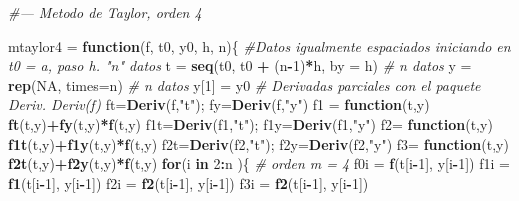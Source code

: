 \documentclass[]{article}
\newenvironment{Shaded}{\begin{snugshade}}{\end{snugshade}}
\newcommand{\KeywordTok}[1]{\textcolor[rgb]{0.13,0.29,0.53}{\textbf{#1}}}
\newcommand{\DataTypeTok}[1]{\textcolor[rgb]{0.13,0.29,0.53}{#1}}
\newcommand{\DecValTok}[1]{\textcolor[rgb]{0.00,0.00,0.81}{#1}}
\newcommand{\StringTok}[1]{\textcolor[rgb]{0.31,0.60,0.02}{#1}}
\newcommand{\CommentTok}[1]{\textcolor[rgb]{0.56,0.35,0.01}{\textit{#1}}}
\newcommand{\OtherTok}[1]{\textcolor[rgb]{0.56,0.35,0.01}{#1}}
\newcommand{\ControlFlowTok}[1]{\textcolor[rgb]{0.13,0.29,0.53}{\textbf{#1}}}
\newcommand{\OperatorTok}[1]{\textcolor[rgb]{0.81,0.36,0.00}{\textbf{#1}}}
\newcommand{\NormalTok}[1]{#1}
\begin{document}
\begin{Shaded}
\begin{Highlighting}[]
\CommentTok{#--- Metodo de Taylor, orden 4}

\NormalTok{mtaylor4 =}\StringTok{ }\ControlFlowTok{function}\NormalTok{(f, t0, y0, h, n)\{}
\CommentTok{#Datos igualmente espaciados iniciando en t0 = a, paso h. "n" datos }
\NormalTok{t =}\StringTok{ }\KeywordTok{seq}\NormalTok{(t0, t0 }\OperatorTok{+}\StringTok{ }\NormalTok{(n}\OperatorTok{-}\DecValTok{1}\NormalTok{)}\OperatorTok{*}\NormalTok{h, }\DataTypeTok{by =}\NormalTok{ h) }\CommentTok{# n datos}
\NormalTok{y =}\StringTok{ }\KeywordTok{rep}\NormalTok{(}\OtherTok{NA}\NormalTok{, }\DataTypeTok{times=}\NormalTok{n) }\CommentTok{# n datos}
\NormalTok{y[}\DecValTok{1}\NormalTok{] =}\StringTok{ }\NormalTok{y0}
  \CommentTok{# Derivadas parciales con el paquete Deriv. Deriv(f)}
\NormalTok{ft=}\KeywordTok{Deriv}\NormalTok{(f,}\StringTok{"t"}\NormalTok{); fy=}\KeywordTok{Deriv}\NormalTok{(f,}\StringTok{"y"}\NormalTok{)}
\NormalTok{f1 =}\StringTok{ }\ControlFlowTok{function}\NormalTok{(t,y)}
\KeywordTok{ft}\NormalTok{(t,y)}\OperatorTok{+}\KeywordTok{fy}\NormalTok{(t,y)}\OperatorTok{*}\KeywordTok{f}\NormalTok{(t,y)}
\NormalTok{f1t=}\KeywordTok{Deriv}\NormalTok{(f1,}\StringTok{"t"}\NormalTok{);   f1y=}\KeywordTok{Deriv}\NormalTok{(f1,}\StringTok{"y"}\NormalTok{)}
\NormalTok{f2=}\StringTok{ }\ControlFlowTok{function}\NormalTok{(t,y) }\KeywordTok{f1t}\NormalTok{(t,y)}\OperatorTok{+}\KeywordTok{f1y}\NormalTok{(t,y)}\OperatorTok{*}\KeywordTok{f}\NormalTok{(t,y)}
\NormalTok{f2t=}\KeywordTok{Deriv}\NormalTok{(f2,}\StringTok{"t"}\NormalTok{);    f2y=}\KeywordTok{Deriv}\NormalTok{(f2,}\StringTok{"y"}\NormalTok{)}
\NormalTok{f3=}\StringTok{ }\ControlFlowTok{function}\NormalTok{(t,y) }\KeywordTok{f2t}\NormalTok{(t,y)}\OperatorTok{+}\KeywordTok{f2y}\NormalTok{(t,y)}\OperatorTok{*}\KeywordTok{f}\NormalTok{(t,y)}
\ControlFlowTok{for}\NormalTok{(i }\ControlFlowTok{in} \DecValTok{2}\OperatorTok{:}\NormalTok{n )\{}
\CommentTok{# orden m = 4}
\NormalTok{     f0i =}\StringTok{ }\KeywordTok{f}\NormalTok{(t[i}\OperatorTok{-}\DecValTok{1}\NormalTok{], y[i}\OperatorTok{-}\DecValTok{1}\NormalTok{])}
\NormalTok{     f1i =}\StringTok{ }\KeywordTok{f1}\NormalTok{(t[i}\OperatorTok{-}\DecValTok{1}\NormalTok{], y[i}\OperatorTok{-}\DecValTok{1}\NormalTok{])}
\NormalTok{     f2i =}\StringTok{ }\KeywordTok{f2}\NormalTok{(t[i}\OperatorTok{-}\DecValTok{1}\NormalTok{], y[i}\OperatorTok{-}\DecValTok{1}\NormalTok{])}
\NormalTok{     f3i =}\StringTok{ }\KeywordTok{f2}\NormalTok{(t[i}\OperatorTok{-}\DecValTok{1}\NormalTok{], y[i}\OperatorTok{-}\DecValTok{1}\NormalTok{])}

\end{Highlighting}
\end{Shaded}
\end{document}
